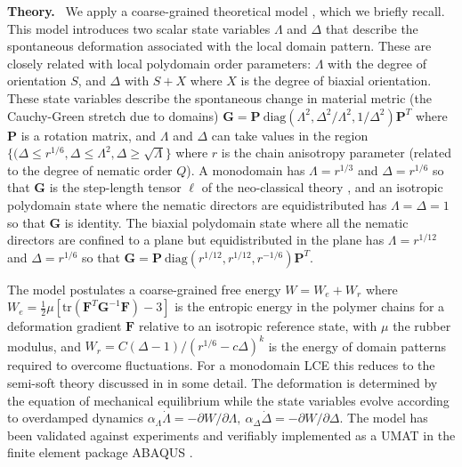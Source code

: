 \documentclass[12pt]{article}
\begin{document}
\vspace{0.15cm}
 \noindent \textbf{Theory.} \ We apply a coarse-grained theoretical model \cite{Lee2023}, which we briefly recall.  This model introduces two scalar state variables $\Lambda$ and $\Delta$ that describe the spontaneous deformation associated with the local domain pattern.  These are closely related with local polydomain order parameters: $\Lambda$ with the degree of orientation $S$, and $\Delta$ with $S+X$ where $X$ is the degree of biaxial orientation. These state variables describe the spontaneous change in material metric (the Cauchy-Green stretch due to domains) $\bm{G} = \bm{P} \ \text{diag}(\Lambda^2,\Delta^2/\Lambda^2,1/\Delta^2) \bm{P}^T$ where $\bm{P}$ is a rotation matrix, and $\Lambda$ and $\Delta$ can take values in the region $\{( \Delta \le r^{1/6}, \Delta \le \Lambda^2, \Delta \ge \sqrt{\Lambda}\}$ where $r$ is the chain anisotropy parameter (related to the degree of nematic order $Q$).  A monodomain has $\Lambda=r^{1/3}$ and $\Delta=r^{1/6}$ so that $\bm{G}$ is the step-length tensor $\bm \ell$ of the neo-classical theory \cite{WTbook}, and an isotropic polydomain state where the nematic directors are equidistributed has $\Lambda=\Delta=1$ so that $\bm{G}$ is identity.  The biaxial polydomain state where all the nematic directors are confined to a plane but equidistributed in the plane has $\Lambda=r^{1/12}$ and $\Delta=r^{1/6}$ so that $\bm{G}= \bm{P} \ \text{diag} (r^{1/12}, r^{1/12}, r^{-1/6})\bm{P}^T$.
 
 The model postulates a coarse-grained free energy $W=W_e+W_r$ where $W_e = \frac{1}{2}\mu [\text{tr} (\bm{F}^T \bm{G}^{-1} \bm{F}) - 3]$ is the entropic energy in the polymer chains for a deformation gradient $\bm{F}$ relative to an isotropic reference state, with $\mu$ the rubber modulus, and $W_r = C(\Delta-1)/(r^{1/6}- c \Delta )^k$ is the energy of domain patterns required to overcome fluctuations. For a monodomain LCE this reduces to the semi-soft theory discussed in \cite{WTbook} in some detail. The deformation is determined by the equation of mechanical equilibrium while the state variables evolve according to overdamped dynamics
 $\alpha_\Lambda \dot \Lambda = -\partial W/\partial \Lambda, \ \alpha_\Delta \dot \Delta = - \partial W/\partial \Delta$.  The model has been validated against experiments and verifiably implemented as a UMAT in the finite element package ABAQUS \cite{Lee2023}.     
\end{document}
